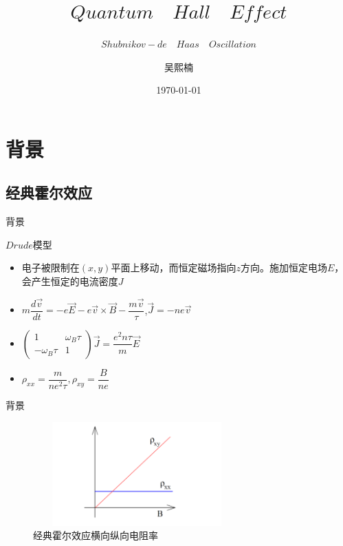 \documentclass{beamer}
\author{吴熙楠}
\title{$Quantum\quad Hall\quad Effect$}
\subtitle{$Shubnikov-de\quad Haas\quad Oscillation$}
\institute{北京大学物理学院}
\date{\today}
\begin{document}
\kaishu
\begin{frame}
    \titlepage
\end{frame}

\begin{frame}
    \tableofcontents[sectionstyle=show,subsectionstyle=show/shaded/hide,subsubsectionstyle=show/shaded/hide]
\end{frame}


\section{背景}
\subsection{经典霍尔效应}
\begin{frame}{背景}
	\begin{block}{$Drude$模型}
		\begin{itemize}
			\item 电子被限制在$(x,y)$平面上移动，而恒定磁场指向$z$方向。施加恒定电场$E$，会产生恒定的电流密度$J$
			\item $m\dfrac{d\vec{v}}{dt}=-e\vec{E}-e\vec{v}\times \vec{B}-\dfrac{m\vec{v}}{\tau}$,$\vec{J}=-ne\vec{v}$
			\item 	$\begin{pmatrix}
				1&\omega_{B}\tau\\
				-\omega_{B}\tau&1
			\end{pmatrix}\vec{J}=\dfrac{e^{2}n\tau}{m}\vec{E}$
		\item $\rho_{xx}=\dfrac{m}{ne^{2}\tau},\rho_{xy}=\dfrac{B}{ne}$
		\end{itemize}
	\end{block}
\end{frame}
\begin{frame}{背景}
	\begin{figure}[H]
		\begin{center}
			\includegraphics[width=8cm,height=4cm]{pic/1.png}
			\caption{经典霍尔效应横向纵向电阻率\cite{meng2018integer}}
		\end{center}
	\end{figure}
\end{frame}
\end{document}
